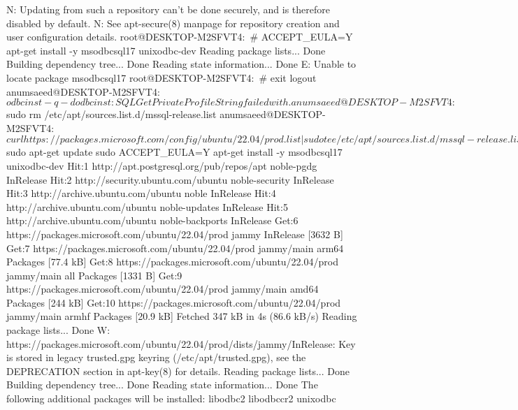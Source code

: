 N: Updating from such a repository can't be done securely, and is therefore disabled by default.
N: See apt-secure(8) manpage for repository creation and user configuration details.
root@DESKTOP-M2SFVT4:~# ACCEPT_EULA=Y apt-get install -y msodbcsql17 unixodbc-dev
Reading package lists... Done
Building dependency tree... Done
Reading state information... Done
E: Unable to locate package msodbcsql17
root@DESKTOP-M2SFVT4:~# exit
logout
anumsaeed@DESKTOP-M2SFVT4:~$ odbcinst -q -d
odbcinst: SQLGetPrivateProfileString failed with .
anumsaeed@DESKTOP-M2SFVT4:~$ sudo rm /etc/apt/sources.list.d/mssql-release.list
anumsaeed@DESKTOP-M2SFVT4:~$ curl https://packages.microsoft.com/config/ubuntu/22.04/prod.list | sudo tee /etc/apt/sources.list.d/mssql-release.list
                                 Dload  Upload   Total   Spent    Left  Speed
  0     0    0     0    0     0      0      0 --:--:-- --:--:-- --:--:--  0     0    0     0    0     0      0      0 --:--:-- --:--:-- --:--:--100    89  100    89    0     0     46      0  0:00:01  0:00:01 --:--:--100    89  100    89    0     0     46      0  0:00:01  0:00:01 --:--:--    46
deb [arch=amd64,arm64,armhf] https://packages.microsoft.com/ubuntu/22.04/prod jammy main
anumsaeed@DESKTOP-M2SFVT4:~$ sudo apt-get update
sudo ACCEPT_EULA=Y apt-get install -y msodbcsql17 unixodbc-dev
Hit:1 http://apt.postgresql.org/pub/repos/apt noble-pgdg InRelease
Hit:2 http://security.ubuntu.com/ubuntu noble-security InRelease
Hit:3 http://archive.ubuntu.com/ubuntu noble InRelease
Hit:4 http://archive.ubuntu.com/ubuntu noble-updates InRelease
Hit:5 http://archive.ubuntu.com/ubuntu noble-backports InRelease
Get:6 https://packages.microsoft.com/ubuntu/22.04/prod jammy InRelease [3632 B]
Get:7 https://packages.microsoft.com/ubuntu/22.04/prod jammy/main arm64 Packages [77.4 kB]
Get:8 https://packages.microsoft.com/ubuntu/22.04/prod jammy/main all Packages [1331 B]
Get:9 https://packages.microsoft.com/ubuntu/22.04/prod jammy/main amd64 Packages [244 kB]
Get:10 https://packages.microsoft.com/ubuntu/22.04/prod jammy/main armhf Packages [20.9 kB]
Fetched 347 kB in 4s (86.6 kB/s)
Reading package lists... Done
W: https://packages.microsoft.com/ubuntu/22.04/prod/dists/jammy/InRelease: Key is stored in legacy trusted.gpg keyring (/etc/apt/trusted.gpg), see the DEPRECATION section in apt-key(8) for details.
Reading package lists... Done
Building dependency tree... Done
Reading state information... Done
The following additional packages will be installed:
  libodbc2 libodbccr2 unixodbc
